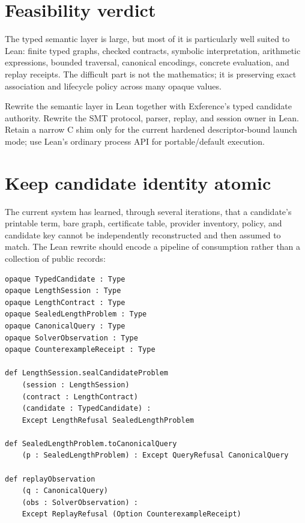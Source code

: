 \documentclass[10pt,letterpaper,oneside]{report}
\begin{document}
\section{Feasibility verdict}

The typed semantic layer is large, but most of it is particularly well suited to Lean: finite typed graphs, checked contracts, symbolic interpretation, arithmetic expressions, bounded traversal, canonical encodings, concrete evaluation, and replay receipts. The difficult part is not the mathematics; it is preserving exact association and lifecycle policy across many opaque values.

\begin{verdictbox}[title={Semantic/Z3 verdict}]
Rewrite the semantic layer in Lean together with Exference's typed candidate authority. Rewrite the SMT protocol, parser, replay, and session owner in Lean. Retain a narrow C shim only for the current hardened descriptor-bound launch mode; use Lean's ordinary process API for portable/default execution.
\end{verdictbox}

\section{Keep candidate identity atomic}

The current system has learned, through several iterations, that a candidate's printable term, bare graph, certificate table, provider inventory, policy, and candidate key cannot be independently reconstructed and then assumed to match. The Lean rewrite should encode a pipeline of consumption rather than a collection of public records:

\begin{lstlisting}[language=Leanish]
opaque TypedCandidate : Type
opaque LengthSession : Type
opaque LengthContract : Type
opaque SealedLengthProblem : Type
opaque CanonicalQuery : Type
opaque SolverObservation : Type
opaque CounterexampleReceipt : Type

def LengthSession.sealCandidateProblem
    (session : LengthSession)
    (contract : LengthContract)
    (candidate : TypedCandidate) :
    Except LengthRefusal SealedLengthProblem

def SealedLengthProblem.toCanonicalQuery
    (p : SealedLengthProblem) : Except QueryRefusal CanonicalQuery

def replayObservation
    (q : CanonicalQuery)
    (obs : SolverObservation) :
    Except ReplayRefusal (Option CounterexampleReceipt)
\end{lstlisting}
\end{document}

